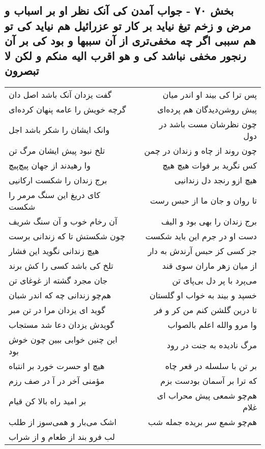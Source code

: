\begin{center}
\section*{بخش ۷۰ - جواب آمدن کی آنک نظر او بر اسباب و مرض و زخم تیغ نیاید بر کار تو عزرائیل هم نیاید کی تو هم سببی اگر چه مخفی‌تری از آن سببها و بود کی بر آن رنجور مخفی نباشد کی و هو اقرب الیه منکم و لکن لا تبصرون}
\label{sec:sh070}
\begin{longtable}{l p{0.5cm} r}
گفت یزدان آنک باشد اصل دان
&&
پس ترا کی بیند او اندر میان
\\
گرچه خویش را عامه پنهان کرده‌ای
&&
پیش روشن‌دیدگان هم پرده‌ای
\\
وانک ایشان را شکر باشد اجل
&&
چون نظرشان مست باشد در دول
\\
تلخ نبود پیش ایشان مرگ تن
&&
چون روند از چاه و زندان در چمن
\\
وا رهیدند از جهان پیچ‌پیچ
&&
کس نگرید بر فوات هیچ هیچ
\\
برج زندان را شکست ارکانیی
&&
هیچ ازو رنجد دل زندانیی
\\
کای دریغ این سنگ مرمر را شکست
&&
تا روان و جان ما از حبس رست
\\
آن رخام خوب و آن سنگ شریف
&&
برج زندان را بهی بود و الیف
\\
چون شکستش تا که زندانی برست
&&
دست او در جرم این باید شکست
\\
هیچ زندانی نگوید این فشار
&&
جز کسی کز حبس آرندش به دار
\\
تلخ کی باشد کسی را کش برند
&&
از میان زهر ماران سوی قند
\\
جان مجرد گشته از غوغای تن
&&
می‌پرد با پر دل بی‌پای تن
\\
هم‌چو زندانی چه که اندر شبان
&&
خسپد و بیند به خواب او گلستان
\\
گوید ای یزدان مرا در تن مبر
&&
تا درین گلشن کنم من کر و فر
\\
گویدش یزدان دعا شد مستجاب
&&
وا مرو والله اعلم بالصواب
\\
این چنین خوابی ببین چون خوش بود
&&
مرگ نادیده به جنت در رود
\\
هیچ او حسرت خورد بر انتباه
&&
بر تن با سلسله در قعر چاه
\\
مؤمنی آخر در آ در صف رزم
&&
که ترا بر آسمان بودست بزم
\\
بر امید راه بالا کن قیام
&&
هم‌چو شمعی پیش محراب ای غلام
\\
اشک می‌بار و همی‌سوز از طلب
&&
هم‌چو شمع سر بریده جمله شب
\\
لب فرو بند از طعام و از شراب

\end{longtable}
\end{center}
